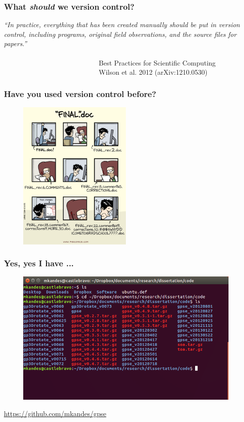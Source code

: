 \documentclass{beamer}
\begin{document}
\begin{frame}
   \frametitle{What \textit{should} we version control?}
   \textit{``In practice, everything that has been created manually should be
   put in version control, including programs, original field 
   observations, and the source files for papers.''} 
   \\ \ \\
   \ \ \ \ \ \ \ \ \ \ \ \ \ \ \ \ \ \ \ \ \ \ \ \ \ \ \ \ 
   Best Practices for Scientific Computing \\
   \ \ \ \ \ \ \ \ \ \ \ \ \ \ \ \ \ \ \ \ \ \ \ \ \ \ \ \ 
   Wilson et al. 2012 (arXiv:1210.0530)
\end{frame}

\begin{frame}
   \frametitle{Have you used version control before?}
   \begin{figure}[htbp]
      \includegraphics[width=0.5\textwidth]{images/version-control-phdcomics.png}
   \end{figure}
\end{frame}

\begin{frame}
   \frametitle{Yes, yes I have ...}
   \begin{figure}[htbp]
      \includegraphics[width=1.0\textwidth]{images/bad-version-control.png}
   \end{figure}
   \url{https://github.com/mkandes/gpse}
\end{frame}
\end{document}
